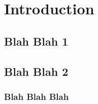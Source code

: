 \documentclass{article}
\begin{document}
\section{Introduction} 
\subsection{Blah Blah 1} 
\subsection{Blah Blah 2} 
\subsubsection{Blah Blah Blah}
\end{document}
